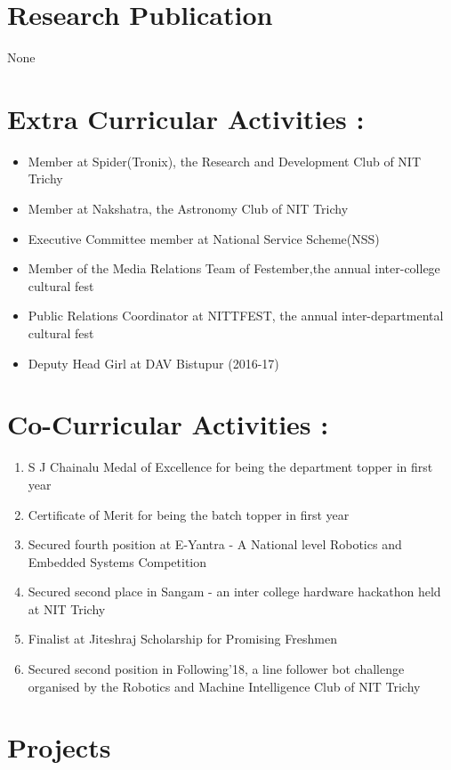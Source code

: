 \documentclass[10pt]{article} %
\begin{document}
\section*{Research Publication} %
None

\section*{Extra Curricular Activities :} %
\begin{itemize}
\item Member at Spider(Tronix), the Research and Development Club of NIT Trichy
\item Member at Nakshatra, the Astronomy Club of NIT Trichy
\item Executive Committee member at National Service Scheme(NSS)
\item Member of the Media Relations Team of Festember,the annual inter-college cultural fest
\item Public Relations Coordinator at NITTFEST, the annual  inter-departmental cultural fest
\item Deputy Head Girl at DAV Bistupur (2016-17)
\end{itemize}


\section*{Co-Curricular Activities :} %
\begin{enumerate}
\item S J Chainalu Medal of Excellence for being the department topper in first year
\item Certificate of Merit for being the batch topper in first year
\item Secured fourth position at E-Yantra - A National level Robotics and Embedded Systems Competition
\item Secured second place in Sangam - an inter college hardware hackathon held at NIT Trichy
\item Finalist at Jiteshraj Scholarship for Promising Freshmen
\item Secured second position in Following'18, a line follower bot challenge organised by the Robotics and Machine Intelligence Club of NIT Trichy
\end{enumerate}

\section*{Projects}
\end{document}
